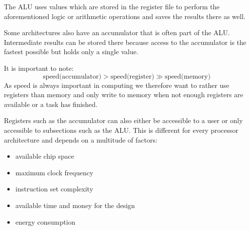 The ALU uses values which are stored in the register file to perform the aforementioned logic or arithmetic operations and saves the results there as well.

Some architectures also have an accumulator that is often part of the ALU.
Intermediate results can be stored there because access to the accumulator is the fastest possible but holds only a single value.

It is important to note:
\begin{equation*}
    \text{speed(accumulator)} > \text{speed(register)} \gg \text{speed(memory)}
\end{equation*}
As speed is always important in computing we therefore want to rather use registers than memory and only write to memory when not enough registers are available or a task has finished.

Registers such as the accumulator can also either be accessible to a user or only accessible to subsections such as the ALU.
This is different for every processor architecture and depends on a multitude of factors:
\noindent\begin{minipage}{\textwidth}
    \vspace{1em}
    \begin{minipage}{0.4\textwidth}
\begin{itemize}
    \item available chip space
    \item maximum clock frequency
    \item instruction set complexity
\end{itemize}
\end{minipage}
    \begin{minipage}{0.6\textwidth}
\begin{itemize}
    \item available time and money for the design
    \item energy consumption
\end{itemize}
\end{minipage}
    \vspace{1em}
\end{minipage}

